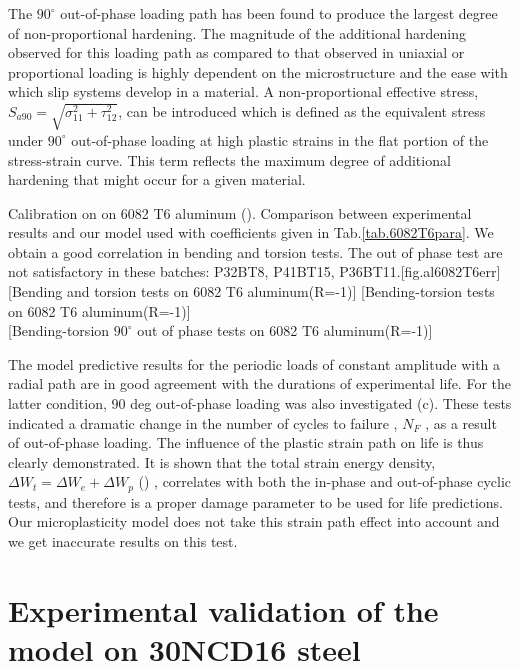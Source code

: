 The $90^\circ$ out-of-phase loading path has been found to produce the largest degree of non-proportional hardening. The magnitude of the additional hardening observed for this loading path as compared to that observed in uniaxial or proportional loading is highly dependent on the microstructure and the ease with which slip systems develop in a material. A non-proportional effective stress, $S_{a90}=\sqrt{\sigma_{11}^2+\tau_{12}^2}$, can be introduced which is defined as the equivalent stress under $90^\circ$ out-of-phase loading at high plastic strains in the flat portion of the stress-strain curve. This term reflects the maximum degree of additional hardening that might occur for a given material.



\begin{Figure}[!h]{Calibration on on 6082 T6 aluminum (\cite{susmel2003multiaxial}). Comparison between experimental results and our model used with coefficients given in Tab.\ref{tab.6082T6para}. We obtain a good correlation in bending and torsion tests. The out of phase test are not satisfactory in these batches: P32BT8, P41BT15, P36BT11.}[fig.al6082T6err]
[Bending and torsion tests on 6082 T6 aluminum(R=-1)]
[Bending-torsion tests on 6082 T6 aluminum(R=-1)]
\\
[Bending-torsion $90^\circ$ out of phase tests on 6082 T6 aluminum(R=-1)]
\end{Figure}

The model predictive results for the periodic loads of constant amplitude with a radial path are in good agreement with the durations of experimental life. For the latter condition, 90 deg out-of-phase loading was also investigated (c). These tests indicated a dramatic change in the number of cycles to failure , $N_F$ , as a result of out-of-phase loading. The influence of the plastic strain path on life is thus clearly demonstrated. It is shown that the total strain energy density, $\Delta W_t = \Delta W_e+ \Delta W_p$ (\cite{ellyin1991phase}) , correlates with both the in-phase and out-of-phase cyclic tests, and therefore is a proper damage parameter to be used for life predictions. Our microplasticity model does not take this strain path effect into account and we get inaccurate results on this test.



\clearpage
\section{Experimental validation of the model on 30NCD16 steel}
